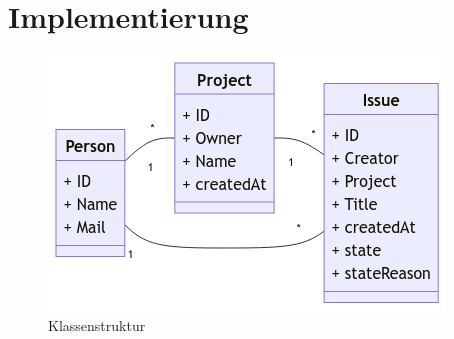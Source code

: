 \chapter{Implementierung} %
\label{sec:implementierung}
\begin{figure}[h!]
	\centering
	\includegraphics[scale=1]{Illustrations/class_diagram.png}
	\caption{Klassenstruktur}
\end{figure}

